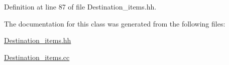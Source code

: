 Definition at line 87 of file Destination\+\_\+items.\+hh.



The documentation for this class was generated from the following files\+:\begin{DoxyCompactItemize}
\item 
\hyperlink{_destination__items_8hh}{Destination\+\_\+items.\+hh}\item 
\hyperlink{_destination__items_8cc}{Destination\+\_\+items.\+cc}\end{DoxyCompactItemize}
